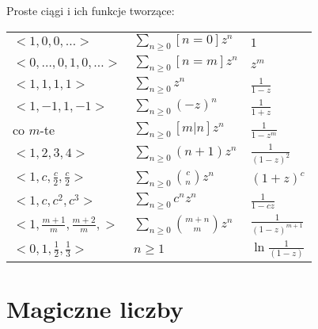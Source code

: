 \documentclass[10pt,a4paper,twocolumn]{article}
\begin{document}
Proste ciągi i ich funkcje tworzące:
\begin{tabular}{ | l | l | l |  }
    \hline
    $<1,0,0,\dots>$
      & $\sum_{n \geq 0}[n=0] z^n$
      & $1$ \\
    $<0,\dots, 0,1,0,\dots>$
      & $\sum_{n \geq 0}[n=m] z^n$
      & $z^m$ \\
    $<1,1,1,1>$
      & $\sum_{n \geq 0} z^n$
      & $\frac{1}{1-z}$ \\
    $<1,-1,1,-1>$
      & $\sum_{n \geq 0} (-z)^n$
      & $\frac{1}{1+z}$ \\
    co $m$-te
      & $\sum_{n \geq 0} [m | n]z^n$
      & $\frac{1}{1-z^m}$ \\
    $<1,2,3,4>$
      & $\sum_{n \geq 0} (n+1)z^n$
      & $\frac{1}{(1-z)^2}$ \\
    $<1,c,\frac{c}{2},\frac{c}{2}>$
      & $\sum_{n \geq 0} \binom{c}{n}z^n$
      & $(1+z)^c$ \\
    $<1,c,c^2,c^3>$
      & $\sum_{n \geq 0} c^n z^n$
      & $\frac{1}{1-cz}$ \\
    $<1,\frac{m+1}{m},\frac{m+2}{m},>$
      & $\sum_{n \geq 0} \binom{m+n}{m} z^n$
      & $ \frac{1}{(1-z)^{m+1}}$ \\
    $<0,1,\frac{1}{2},\frac{1}{3}>$
      & $n \geq 1$
      & $\ln \frac{1}{(1-z)}$ \\
    \hline
\end{tabular}

\section{Magiczne liczby}
\end{document}
